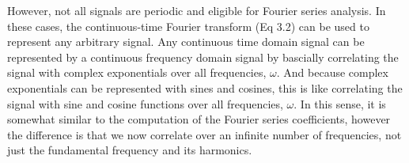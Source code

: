   
  
%  

   
    
  However, not all signals are periodic and eligible for Fourier series analysis.  In these cases, the continuous-time Fourier transform (Eq 3.2) can be used to represent any arbitrary signal. Any continuous time domain signal can be represented by a continuous frequency domain signal by bascially correlating the signal with complex exponentials over all frequencies, \begin{math}\omega\end{math}. And because complex exponentials can be represented with sines and cosines, this is like correlating the signal with sine and cosine functions over all frequencies, \begin{math}\omega\end{math}. In this sense, it is somewhat similar to the computation of the Fourier series coefficients, however the difference is that we now correlate over an infinite number of frequencies, not just the fundamental frequency and its harmonics.\\
  
